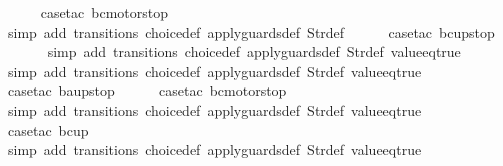 \begin{isabellebody}
\ \ \ \ \isamarkupfalse%
\ {\isacharparenleft}case{\isacharunderscore}tac\ {\isachardoublequoteopen}bc{\isacharequal}motorstop\ {}{\isachardoublequoteclose}{\isacharparenright}\isanewline
\ \ \ \ \ \isamarkupfalse%
\ {\isacharparenleft}simp\ add{\isacharcolon}\ transitions\ choice{\isacharunderscore}def\ apply{\isacharunderscore}guards{\isacharunderscore}def\ Str{\isacharunderscore}def{\isacharparenright}\isanewline
\ \ \ \ \isamarkupfalse%
\ {\isacharparenleft}case{\isacharunderscore}tac\ {\isachardoublequoteopen}bc{\isacharequal}up{}{}stop{\isachardoublequoteclose}{\isacharparenright}\isanewline
\ \ \ \ \ \isamarkupfalse%
\ {\isacharparenleft}simp\ add{\isacharcolon}\ transitions\ choice{\isacharunderscore}def\ apply{\isacharunderscore}guards{\isacharunderscore}def\ Str{\isacharunderscore}def\ value{\isacharunderscore}eq{\isacharunderscore}true{\isacharparenright}\isanewline
\ \ \ \ \ \isamarkupfalse%
\ {\isacharparenleft}simp\ add{\isacharcolon}\ transitions\ choice{\isacharunderscore}def\ apply{\isacharunderscore}guards{\isacharunderscore}def\ Str{\isacharunderscore}def\ value{\isacharunderscore}eq{\isacharunderscore}true{\isacharparenright}\isanewline
\ \ \ \isamarkupfalse%
\ {\isacharparenleft}case{\isacharunderscore}tac\ {\isachardoublequoteopen}ba{\isacharequal}up{}{}stop{\isachardoublequoteclose}{\isacharparenright}\isanewline
\ \ \ \ \isamarkupfalse%
\ {\isacharparenleft}case{\isacharunderscore}tac\ {\isachardoublequoteopen}bc{\isacharequal}motorstop\ {}{\isachardoublequoteclose}{\isacharparenright}\isanewline
\ \ \ \ \ \isamarkupfalse%
\ {\isacharparenleft}simp\ add{\isacharcolon}\ transitions\ choice{\isacharunderscore}def\ apply{\isacharunderscore}guards{\isacharunderscore}def\ Str{\isacharunderscore}def\ value{\isacharunderscore}eq{\isacharunderscore}true{\isacharparenright}\isanewline
\ \ \ \ \isamarkupfalse%
\ {\isacharparenleft}case{\isacharunderscore}tac\ {\isachardoublequoteopen}bc{\isacharequal}up{}{}{\isachardoublequoteclose}{\isacharparenright}\isanewline
\ \ \ \ \ \isamarkupfalse%
\ {\isacharparenleft}simp\ add{\isacharcolon}\ transitions\ choice{\isacharunderscore}def\ apply{\isacharunderscore}guards{\isacharunderscore}def\ Str{\isacharunderscore}def\ value{\isacharunderscore}eq{\isacharunderscore}true{\isacharparenright}\isanewline
\ \ \ \ \isamarkupfalse%

\end{isabellebody}
